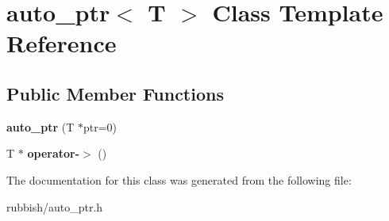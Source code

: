 \hypertarget{classauto__ptr}{\section{auto\-\_\-ptr$<$ T $>$ Class Template Reference}
\label{classauto__ptr}
}
\subsection*{Public Member Functions}
\begin{DoxyCompactItemize}
\item 
\hypertarget{classauto__ptr_ac7e207040ab934e5760286bff1009967}{{\bfseries auto\-\_\-ptr} (T $\ast$ptr=0)}\label{classauto__ptr_ac7e207040ab934e5760286bff1009967}

\item 
\hypertarget{classauto__ptr_a2ce694830c7f958825b05be8442f0bad}{T $\ast$ {\bfseries operator-\/$>$} ()}\label{classauto__ptr_a2ce694830c7f958825b05be8442f0bad}

\end{DoxyCompactItemize}


The documentation for this class was generated from the following file\-:\begin{DoxyCompactItemize}
\item 
rubbish/auto\-\_\-ptr.\-h\end{DoxyCompactItemize}
